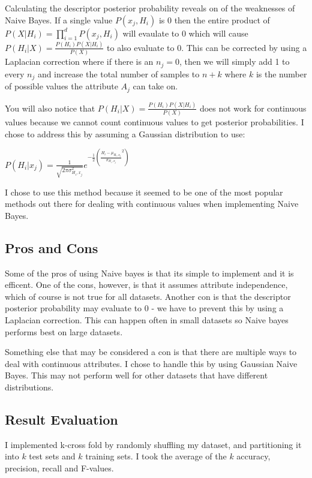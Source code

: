 \documentclass[paper=letter, fontsize=11pt]{article}
\numberwithin{equation}{section}		%
\numberwithin{figure}{section}			%
\numberwithin{table}{section}				%
\begin{document}
\noindent Calculating the descriptor posterior probability reveals on of the weaknesses of Naive Bayes. If a single value $P(x_j, H_i)$ is 0 then the entire product of $P(X|H_i) = \prod_{i=1}^{d} P(x_j, H_i)$ will evaulate to 0 which will cause $P(H_i|X) = \frac{P(H_i)P(X|H_i)}{P(X)}$ to also evaluate to 0. This can be corrected by using a Laplacian correction where if there is an $n_j = 0$, then we will simply add 1 to every $n_j$ and increase the total number of samples to $n+k$ where $k$ is the number of possible values the attribute $A_j$ can take on. 

\noindent You will also notice that $P(H_i|X) = \frac{P(H_i)P(X|H_i)}{P(X)}$ does not work for continuous values because we cannot count continuous values to get posterior probabilities. I chose to address this by assuming a Gaussian distribution to use:

\begin{center} $P(H_i | x_j) = \frac{1}{\sqrt{2\pi\sigma_{H_i,x_j}^2}}e^{-\frac{1}{2}(\frac{H_i-\mu_{H_i,x_j}}{\sigma_{H_i,x_j}}^2)}$ \end{center}

\noindent I chose to use this method because it seemed to be one of the most popular methods out there for dealing with continuous values when implementing Naive Bayes. 

\subsection{Pros and Cons}
Some of the pros of using Naive bayes is that its simple to implement and it is efficent. One of the cons, however, is that it assumes attribute independence, which of course is not true for all datasets. Another con is that the descriptor posterior probability may evaluate to 0 - we have to prevent this by using a Laplacian correction. This can happen often in small datasets so Naive bayes performs best on large datasets. 

\noindent Something else that may be considered a con is that there are multiple ways to deal with continuous attributes. I chose to handle this by using Gaussian Naive Bayes. This may not perform well for other datasets that have different distributions. 

\subsection{Result Evaluation}
I implemented k-cross fold by randomly shuffling my dataset, and partitioning it into $k$ test sets and $k$ training sets. I took the average of the $k$ accuracy, precision, recall and F-values. \\
\end{document}
